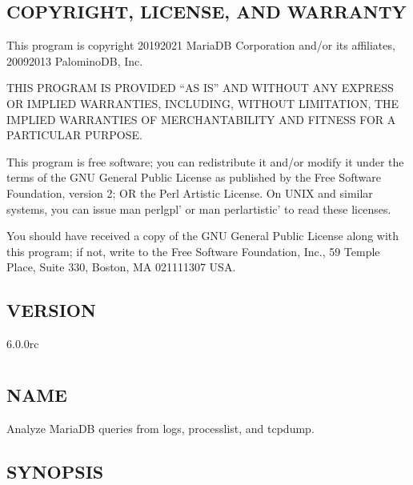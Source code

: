 \documentclass[letterpaper,10pt,english]{sphinxmanual}
\begin{document}
\section{COPYRIGHT, LICENSE, AND WARRANTY}
\label{\detokenize{mariadb-parted:copyright-license-and-warranty}}
This program is copyright 2019\sphinxhyphen{}2021 MariaDB Corporation and/or its affiliates,
2009\sphinxhyphen{}2013 PalominoDB, Inc.

THIS PROGRAM IS PROVIDED “AS IS” AND WITHOUT ANY EXPRESS OR IMPLIED
WARRANTIES, INCLUDING, WITHOUT LIMITATION, THE IMPLIED WARRANTIES OF
MERCHANTABILITY AND FITNESS FOR A PARTICULAR PURPOSE.

This program is free software; you can redistribute it and/or modify it under
the terms of the GNU General Public License as published by the Free Software
Foundation, version 2; OR the Perl Artistic License.  On UNIX and similar
systems, you can issue \textasciigrave{}man perlgpl’ or \textasciigrave{}man perlartistic’ to read these
licenses.

You should have received a copy of the GNU General Public License along with
this program; if not, write to the Free Software Foundation, Inc., 59 Temple
Place, Suite 330, Boston, MA  02111\sphinxhyphen{}1307  USA.


\section{VERSION}
\label{\detokenize{mariadb-parted:version}}
 6.0.0rc


\chapter{}
\label{\detokenize{mariadb-query-digest:mariadb-query-digest}}\label{\detokenize{mariadb-query-digest::doc}}

\section{NAME}
\label{\detokenize{mariadb-query-digest:name}}
 \sphinxhyphen{} Analyze MariaDB queries from logs, processlist, and tcpdump.


\section{SYNOPSIS}
\label{\detokenize{mariadb-query-digest:synopsis}}
\end{document}
